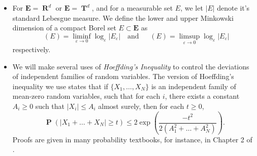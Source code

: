 \documentclass[12pt,reqno]{article}
\numberwithin{equation}{section}
\DeclareMathOperator{\lowminkdim}{\underline{\dim}_{\mathbf{M}}}
\DeclareMathOperator{\upminkdim}{\overline{\dim}_{\mathbf{M}}}
\DeclareMathOperator{\RR}{\mathbf{R}}
\DeclareMathOperator{\TT}{\mathbf{T}}
\DeclareMathOperator{\EE}{\mathbf{E}}
\DeclareMathOperator{\PP}{\mathbf{P}}
\newcommand{\psitwo}[1]{\| {#1} \|_{\psi_2(L)}}
\begin{document}
\begin{itemize}
    \item For $\mathbf{E} = \RR^d$ or $\mathbf{E} = \TT^d$, and for a measurable set $E$, we let $|E|$ denote it's standard Lebesgue measure. We define the lower and upper Minkowski dimension of a compact Borel set $E \subset \mathbf{E}$ as
    \[ \lowminkdim(E) = \liminf_{\varepsilon \to 0} \log_\varepsilon|E_\varepsilon| \quad\text{and}\quad \upminkdim(E) = \limsup_{\varepsilon \to 0} \log_\varepsilon |E_\varepsilon| \]
    respectively.

    \item We will make several uses of \emph{Hoeffding's Inequality} to control the deviations of independent families of random variables. The version of Hoeffding's inequality we use states that if $\{ X_1, \dots, X_N \}$ is an independent family of mean-zero random variables, such that for each $i$, there exists a constant $A_i \geq 0$ such that $|X_i| \leq A_i$ almost surely, then for each $t \geq 0$,
    \[ \PP \left( |X_1 + \dots + X_N| \geq t \right) \leq 2 \exp \left(\frac{-t^2}{2(A_1^2 + \dots + A_N^2)} \right). \]
    Proofs are given in many probability textbooks, for instance, in Chapter 2 of \cite{Vershynin}.
    \begin{comment}

    \item Our random construction involves a probabilistic concentration of measure argument. Define a convex function $\psi_2: [0,\infty) \to [0,\infty)$ by setting
    \[ \psi_2(t) = e^{t^2} - 1, \]
    The function $\psi_2$ induces an Orlicz norm on the family of scalar valued random variables over a probability space by setting, for each random variable $X$,
    \[ \psitwo{X} = \inf \left\{ A \in (0,\infty) : \EE(\psi_2(|X|/A)) \leq 1 \right\}. \]
    The family of random variables with $\psitwo{X} < \infty$ are known as \emph{subgaussian random variables}. Here are the important properties of subgaussian random variables which we use in this paper:
    \begin{itemize}
        \item If $\psitwo{X} \leq A$, then for each $t \geq 0$,
        \[ \PP \left( |X| \geq t \right) \leq 10 \exp \left( -t^2/10A^2 \right). \]
        Thus Subgaussian random variables have Gaussian tails.

        \item If $|X| \leq A$ almost surely, then $\psitwo{X} \leq 10 A$. Thus bounded random variables are subgaussian.


\end{comment}
\end{itemize}
\end{document}
